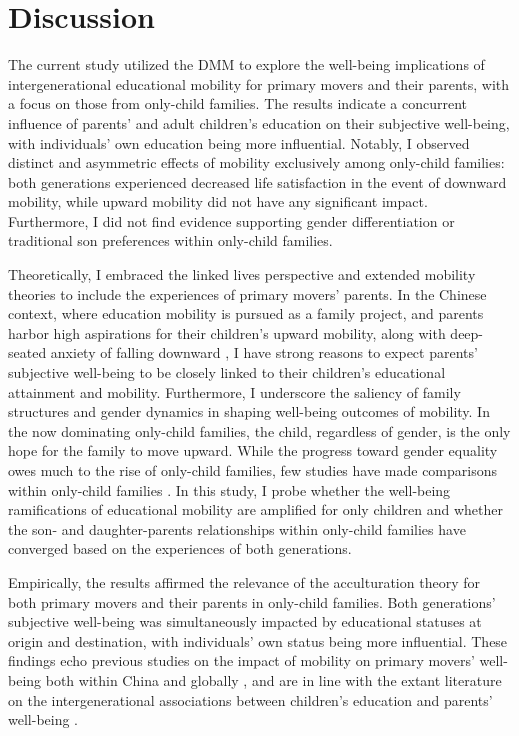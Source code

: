 \section{Discussion}
\label{sec:ch2-discussion}

The current study utilized the DMM to explore the well-being implications of intergenerational educational mobility for primary movers and their parents, with a focus on those from only-child families. The results indicate a concurrent influence of parents' and adult children's education on their subjective well-being, with individuals' own education being more influential. Notably, I observed distinct and asymmetric effects of mobility exclusively among only-child families: both generations experienced decreased life satisfaction in the event of downward mobility, while upward mobility did not have any significant impact. Furthermore, I did not find evidence supporting gender differentiation or traditional son preferences within only-child families.

Theoretically, I embraced the linked lives perspective and extended mobility theories to include the experiences of primary movers' parents. In the Chinese context, where education mobility is pursued as a family project, and parents harbor high aspirations for their children's upward mobility, along with deep-seated anxiety of falling downward \parencite{guSacrificeIndebtednessIntergenerational2022,guWhyChineseAdolescent2021,mengWhenAnxiousMothers2020}, I have strong reasons to expect parents' subjective well-being to be closely linked to their children's educational attainment and mobility. Furthermore, I underscore the saliency of family structures and gender dynamics in shaping well-being outcomes of mobility. In the now dominating only-child families, the child, regardless of gender, is the only hope for the family to move upward. While the progress toward gender equality owes much to the rise of only-child families, few studies have made comparisons within only-child families \parencite{fongChinasOneChildPolicy2002,liuWhoBenefitsBeing2021,wuFertilityDeclineWomens2014}. In this study, I probe whether the well-being ramifications of educational mobility are amplified for only children and whether the son- and daughter-parents relationships within only-child families have converged based on the experiences of both generations.

Empirically, the results affirmed the relevance of the acculturation theory for both primary movers and their parents in only-child families. Both generations' subjective well-being was simultaneously impacted by educational statuses at origin and destination, with individuals' own status being more influential. These findings echo previous studies on the impact of mobility on primary movers' well-being both within China and globally \parencite{dhooreSocialMobilityLife2019,kwonImpactIntergenerationalMobility2022,schuckDoesIntergenerationalEducational2018,zangFrustratedAchieversSatisfied2016}, and are in line with the extant literature on the intergenerational associations between children's education and parents' well-being \parencite{chenEducationFeverChina2021,maDoesAdultChildrens2022}.

